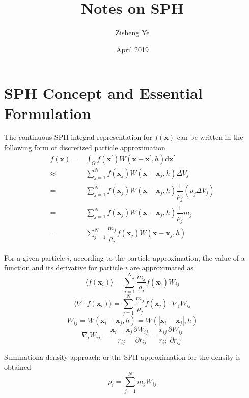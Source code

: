 \documentclass[letterpaper,12pt]{article}
\title{Notes on SPH}
\author{Zisheng Ye}
\date{April 2019}
\numberwithin{equation}{section}
\begin{document}
\maketitle

\section{SPH Concept and Essential Formulation}
The continuous SPH integral representation for $f(\mathbf{x})$ can be written in the following form of discretized particle approximation
\begin{align}
    f(\mathbf{x}) =& \int_{\Omega} f(\mathbf{x}^\prime) W(\mathbf{x} - \mathbf{x}^\prime, h) \mathrm{d} \mathbf{x}^\prime \nonumber \\
    \approx& \sum_{j = 1}^N f(\mathbf{x}_j) W(\mathbf{x} - \mathbf{x}_j, h) \Delta V_j \nonumber \\
    =& \sum_{j = 1}^N f(\mathbf{x}_j) W(\mathbf{x} - \mathbf{x}_j, h) \dfrac1{\rho_j}(\rho_j \Delta V_j) \nonumber \\
    =& \sum_{j = 1}^N f(\mathbf{x}_j) W(\mathbf{x} - \mathbf{x}_j, h) \dfrac1{\rho_j} m_j \nonumber \\
    =& \sum_{j = 1}^N \dfrac{m_j}{\rho_j} f(\mathbf{x}_j) W(\mathbf{x} - \mathbf{x}_j, h) \label{eq:discretized_particle_approximation}
\end{align}

For a given particle $i$, according to the particle approximation, the value of a function and its derivative for particle $i$ are approximated as
\begin{equation}
    \langle f(\mathbf{x}_i) \rangle = \sum_{j = 1}^N \dfrac{m_j}{\rho_j} f(\mathbf{\mathbf{x}_j}) W_{ij}
\end{equation}
\begin{equation}
    \langle \nabla \cdot f(\mathbf{x}_i) \rangle = \sum_{j = 1}^N \dfrac{m_j}{\rho_j} f(\mathbf{x}_j) \cdot \nabla_i W_{ij}
\end{equation}
\begin{equation}
    W_{ij} = W(\mathbf{x}_i - \mathbf{x}_j, h) = W(| \mathbf{x}_i - \mathbf{x}_j |, h)
\end{equation}
\begin{equation}
    \nabla_i W_{ij} = \dfrac{\mathbf{x}_i - \mathbf{x}_j}{r_{ij}} \dfrac{\partial W_{ij}}{\partial r_{ij}} = \dfrac{x_{ij}}{r_{ij}} \dfrac{\partial W_{ij}}{\partial r_{ij}}
\end{equation}

Summationa density approach: or the SPH approximation for the density is obtained
\begin{equation}
    \rho_i = \sum_{j = 1}^N m_j W_{ij}
\end{equation}
\end{document}
